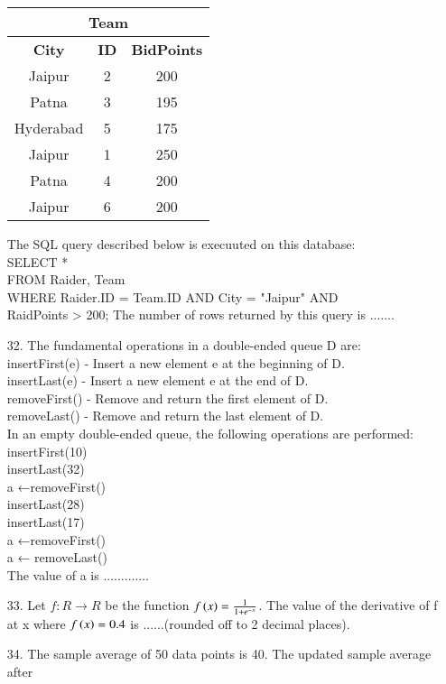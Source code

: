\documentclass[journal]{IEEEtran}
\begin{document}
\begin{enumerate}
\begin{table}
\begin{tabular}{|c|c|c|}
\hline
\multicolumn{3}{|c|}{\textbf{Team}} \\
\hline
\textbf{City} & \textbf{ID} & \textbf{BidPoints} \\
\hline
Jaipur & 2 & 200 \\
Patna & 3 & 195 \\
Hyderabad & 5 & 175 \\
Jaipur & 1 & 250 \\
Patna & 4 & 200 \\
Jaipur & 6 & 200 \\
\hline
\end{tabular}
    \end{table}
    The SQL query described below is execuuted on this database:\\
    SELECT *\\
    FROM Raider, Team\\
    WHERE Raider.ID = Team.ID AND City = "Jaipur" AND \\
    RaidPoints > 200;
    The number of rows returned by this query is ....... 
    \item[32.] The fundamental operations in a double-ended queue D are:\\
    insertFirst(e) - Insert a new element e at the beginning of D.\\
    insertLast(e) - Insert a new element e at the end of D.\\
    removeFirst() - Remove and return the first element of D.\\
    removeLast() - Remove and return the last element of D.\\
    In an empty double-ended queue, the following operations are performed:\\
    insertFirst(10)\\
    insertLast(32)\\
    a ←removeFirst()\\
    insertLast(28)\\
    insertLast(17)\\
    a ←removeFirst()\\
    a ← removeLast()\\
    The value of a is .............
    \item[33.] Let $f:R\to R$ be the function $f\left(x\right) = \frac{1}{1+e^{-x}}$. The value of the derivative of f at x where $f\left(x\right) = 0.4$ is ......(rounded off to 2 decimal places).
    \item[34.] The sample average of 50 data points is 40. The updated sample average after

\end{enumerate}
\end{document}
